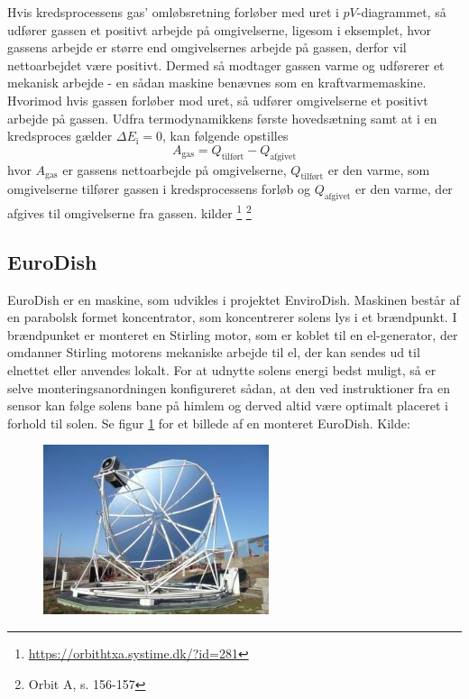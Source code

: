 \documentclass[SRC.tex]{subfiles}
\begin{document}
	Hvis kredsprocessens gas' omløbsretning forløber med uret i \(pV\)-diagrammet, 
	så udfører gassen et positivt arbejde på omgivelserne, ligesom i eksemplet, 
	hvor gassens arbejde er større end omgivelsernes arbejde på gassen, derfor vil 
	nettoarbejdet være positivt. Dermed så modtager gassen varme og 
	udførerer et mekanisk arbejde - en sådan maskine benævnes som en kraftvarmemaskine. Hvorimod hvis gassen forløber mod uret, så udfører 
	omgivelserne et positivt arbejde på gassen. Udfra termodynamikkens første 
	hovedsætning samt at i en kredsproces gælder \(\Delta E_\text{i} = 0\), kan 
	følgende opstilles
	\begin{equation}
	A_{\text{gas}} = Q_{\text{tilført}} - Q_{\text{afgivet}}
	\end{equation} 
	hvor \(A_{\text{gas}}\) er gassens nettoarbejde på omgivelserne, 
	\(Q_{\text{tilført}}\) er den varme, som omgivelserne tilfører gassen i 
	kredsprocessens forløb og \(Q_{\text{afgivet}}\) er den varme, der afgives 
	til omgivelserne fra gassen. kilder \footnote{\url{https://orbithtxa.systime.dk/?id=281}}
	\footnote{Orbit A, s. 156-157}
	
	\subsection{EuroDish}
	EuroDish er en maskine, som udvikles i projektet EnviroDish. Maskinen består
	af en parabolsk formet koncentrator, som koncentrerer solens lys i et brændpunkt. 
	I brændpunket er monteret en Stirling motor, som er koblet til en el-generator,
	der omdanner Stirling motorens mekaniske arbejde til el, der kan sendes ud til 
	elnettet eller anvendes lokalt. For at udnytte solens energi bedst muligt, så er
	selve monteringsanordningen konfigureret sådan, at den ved instruktioner fra en 
	sensor kan følge solens bane på himlem og derved altid være optimalt placeret i forhold til solen. Se figur \ref{fig:744-9} for et billede af en 
	monteret EuroDish. Kilde: %
	\begin{figure}[h]
		\centering
		\includegraphics[scale=0.6]{Billeder/744-9}
		\caption{}
		\label{fig:744-9}
	\end{figure}
\end{document}
